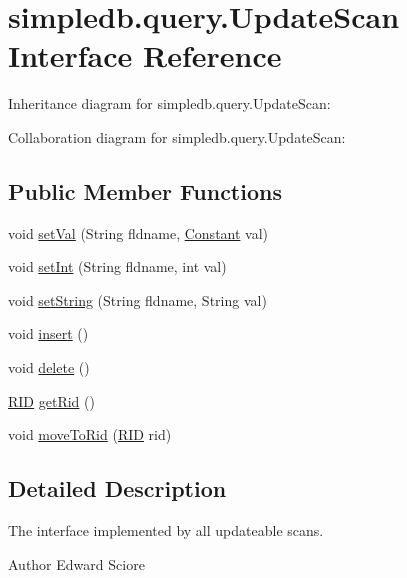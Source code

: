 \hypertarget{interfacesimpledb_1_1query_1_1UpdateScan}{}\section{simpledb.\+query.\+Update\+Scan Interface Reference}
\label{interfacesimpledb_1_1query_1_1UpdateScan}


Inheritance diagram for simpledb.\+query.\+Update\+Scan\+:


Collaboration diagram for simpledb.\+query.\+Update\+Scan\+:
\subsection*{Public Member Functions}
\begin{DoxyCompactItemize}
\item 
void \hyperlink{interfacesimpledb_1_1query_1_1UpdateScan_a70fdd638a395be56dcbc65ecd791f075}{set\+Val} (String fldname, \hyperlink{classsimpledb_1_1query_1_1Constant}{Constant} val)
\item 
void \hyperlink{interfacesimpledb_1_1query_1_1UpdateScan_ad866b1c21bbe8f0442a8779a6240c069}{set\+Int} (String fldname, int val)
\item 
void \hyperlink{interfacesimpledb_1_1query_1_1UpdateScan_a06d8414432dac908fd6c5d337e848f95}{set\+String} (String fldname, String val)
\item 
void \hyperlink{interfacesimpledb_1_1query_1_1UpdateScan_a6a281cd50f596c008e868bddd0534774}{insert} ()
\item 
void \hyperlink{interfacesimpledb_1_1query_1_1UpdateScan_a503723e6287a2ea9ce73375f70a5e819}{delete} ()
\item 
\hyperlink{classsimpledb_1_1record_1_1RID}{R\+ID} \hyperlink{interfacesimpledb_1_1query_1_1UpdateScan_aa98f38fa6d4fc66862e0c739b577ce2d}{get\+Rid} ()
\item 
void \hyperlink{interfacesimpledb_1_1query_1_1UpdateScan_a5096e90da6d88cfaa015cd3aa20bc9d7}{move\+To\+Rid} (\hyperlink{classsimpledb_1_1record_1_1RID}{R\+ID} rid)
\end{DoxyCompactItemize}


\subsection{Detailed Description}
The interface implemented by all updateable scans. \begin{DoxyAuthor}{Author}
Edward Sciore 
\end{DoxyAuthor}


